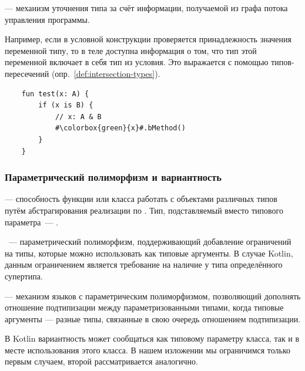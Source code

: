 \begin{definition}
     --- механизм уточнения типа за счёт информации, получаемой из графа потока управления программы.
\end{definition}

Например, если в условной конструкции проверяется принадлежность значения переменной типу, то в теле доступна информация о том, что тип этой переменной включает в себя тип из условия.
Это выражается с помощью типов-пересечений (опр.~\ref{def:intersection-types}).

\begin{verbatim}
    fun test(x: A) {
        if (x is B) {
            // x: A & B
            #\colorbox{green}{x}#.bMethod()
        }
    }
\end{verbatim}

\subsubsection{Параметрический полиморфизм и вариантность}\label{subsubsec:variance}

\begin{definition}
    \label{def:param-poly}
     --- способность функции или класса работать с объектами различных типов путём абстрагирования реализации по .
    Тип, подставляемый вместо типового параметра~--- .
\end{definition}

\begin{definition}
    ~--- параметрический полиморфизм, поддерживающий добавление ограничений на типы, которые можно использовать как типовые аргументы.
    В случае Kotlin, данным ограничением является требование на наличие у типа определённого супертипа.
\end{definition}

\begin{definition}
    \label{def:variance}
     --- механизм языков с параметрическим полиморфизмом, позволяющий дополнять отношение подтипизации между параметризованными типами, когда типовые аргументы --- разные типы, связанные в свою очередь отношением подтипизации.
\end{definition}

В Kotlin вариантность может сообщаться как типовому параметру класса, так и в месте использования этого класса.
В нашем изложении мы ограничимся только первым случаем, второй рассматривается аналогично.

